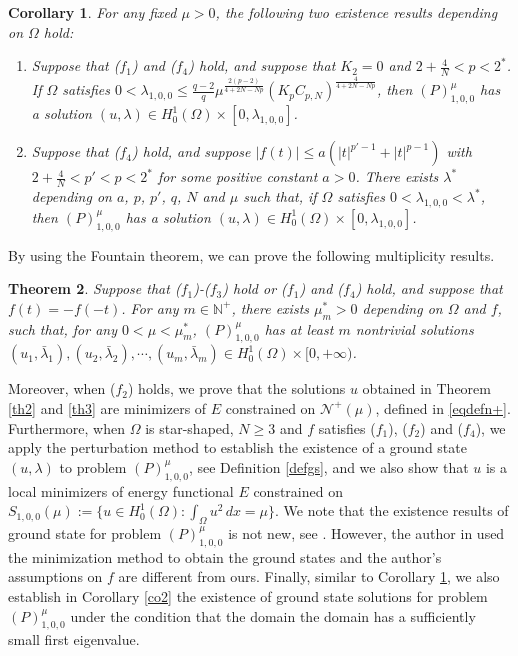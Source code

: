 \documentclass[11pt]{amsart}
\newtheorem{theorem}{Theorem}[section]
\newtheorem{corollary}[theorem]{Corollary}
\newcommand{\abs}[1]{\lvert#1\rvert}
\numberwithin{equation}{section}
\begin{document}
\begin{corollary}\label{co1}
For any fixed $\mu>0$, the following two existence results depending on $\Omega$ hold:
  \begin{enumerate}[label=\rm(\roman*)]
    \item Suppose that ($f_1$) and ($f_4$) hold, and suppose that $K_2=0$ and $2+\frac{4}{N}<p<2^*$. If $\Omega$ satisfies $0<\lambda_{1,0,0}\leq \frac{q-2}{q}\mu^{\frac{2(p-2)}{4+2N-Np}}(K_pC_{p,N})^
    \frac{4}{4+2N-Np}$, then $(P)^{\mu}_{1,0,0}$ has a solution $(u,\lambda) \in H^1_0(\Omega) \times [0,\lambda_{1,0,0}]$.
    \item Suppose that ($f_4$) hold, and suppose $|f(t)|\leq a\left(\abs{t}^{p'-1} +\abs{t}^{p-1}\right)$ with $2+\frac{4}{N}<p'<p<2^*$ for some positive constant $a>0$. There exists $\lambda^*$ depending on $a$, $p$, $p'$, $q$, $N$ and $\mu$ such that, if $\Omega$ satisfies $0<\lambda_{1,0,0}<\lambda^*$, then $(P)^{\mu}_{1,0,0}$ has a solution $(u,\lambda) \in H^1_0(\Omega) \times [0,\lambda_{1,0,0}]$.
\end{enumerate}
\end{corollary}


By using the Fountain theorem, we can prove the following multiplicity results.
\begin{theorem}\label{th4}
 Suppose that ($f_1$)-($f_3$) hold or ($f_1$) and ($f_4$) hold, and suppose that $f(t)=-f(-t)$. For any $m \in \mathbb{N}^+$, there exists $\mu_{m}^* > 0$ depending on $\Omega$ and $f$, such that, for any $0 < \mu < \mu^*_{m}$,  $(P)^{\mu}_{1,0,0}$  has at least $m$ nontrivial solutions $(u_1,\bar{\lambda}_1), (u_2,\bar{\lambda}_2),\cdots,(u_m,\bar{\lambda}_m) \in H^{1}_{0}(\Omega)\times[0,+\infty)$.
\end{theorem}

Moreover, when ($f_2$) holds, we prove that the solutions $u$ obtained in Theorem \ref{th2} and \ref{th3} are minimizers of $E$ constrained on $\mathcal{N}^+(\mu)$, defined in \eqref{eqdefn+}. Furthermore, when $\Omega$ is star-shaped, $N \geq 3$ and $f$ satisfies ($f_1$), ($f_2$) and ($f_4$), we apply the perturbation method to establish the existence of a ground state $(u,\lambda)$ to problem $(P)^{\mu}_{1,0,0}$, see Definition \ref{defgs}, and we also  show that $u$ is a local minimizers of energy functional $E$ constrained on $S_{1,0,0}(\mu):=\{u \in H^1_0(\Omega): \int_{\Omega}u^2\, dx=\mu\}$. We note that the existence results of ground state for problem $(P)^{\mu}_{1,0,0}$ is not new, see \cite{Ji}. However, the author in \cite{Ji} used the minimization method to obtain the ground states and the author's assumptions on $f$ are different from ours. Finally, similar to Corollary \ref{co1}, we also establish in Corollary \ref{co2} the existence of ground state solutions for problem $(P)^{\mu}_{1,0,0}$ under the condition that the domain the domain has a sufficiently small first eigenvalue.
\end{document}
